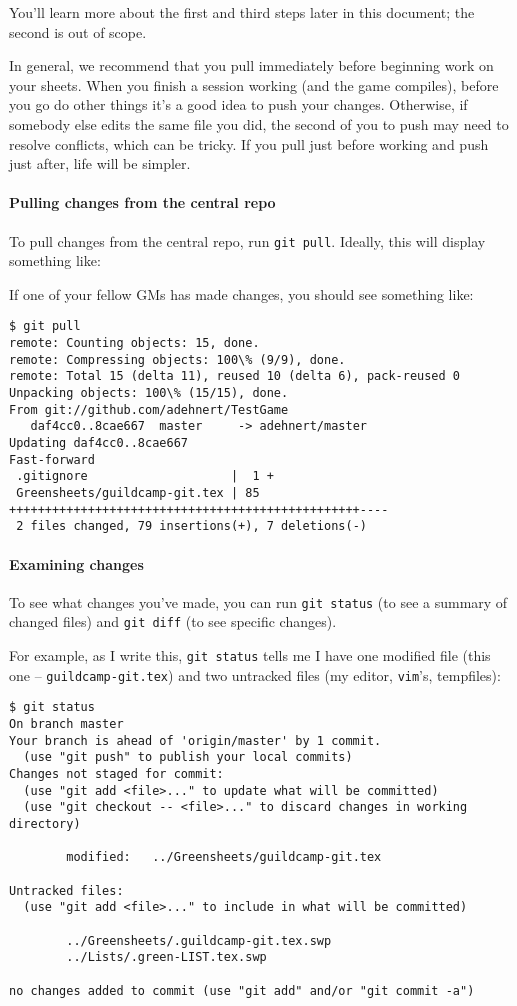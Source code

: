 \documentclass[green]{testgame}
\begin{document}
You'll learn more about the first and third steps later in this document; the second is out of scope.

In general, we recommend that you pull immediately before beginning work on your sheets. When you finish a session working (and the game compiles), before you go do other things it's a good idea to push your changes. Otherwise, if somebody else edits the same file you did, the second of you to push may need to resolve conflicts, which can be tricky. If you pull just before working and push just after, life will be simpler.

\paragraph*{Pulling changes from the central repo}

To pull changes from the central repo, run \texttt{git pull}. Ideally, this will display something like:\\

If one of your fellow GMs has made changes, you should see something like:
\begin{verbatim}
$ git pull
remote: Counting objects: 15, done.
remote: Compressing objects: 100\% (9/9), done.
remote: Total 15 (delta 11), reused 10 (delta 6), pack-reused 0
Unpacking objects: 100\% (15/15), done.
From git://github.com/adehnert/TestGame
   daf4cc0..8cae667  master     -> adehnert/master
Updating daf4cc0..8cae667
Fast-forward
 .gitignore                    |  1 +
 Greensheets/guildcamp-git.tex | 85 +++++++++++++++++++++++++++++++++++++++++++++++++----
 2 files changed, 79 insertions(+), 7 deletions(-)
\end{verbatim}

\paragraph*{Examining changes}

To see what changes you've made, you can run \texttt{git status} (to see a summary of changed files) and \texttt{git diff} (to see specific changes).

For example, as I write this, \texttt{git status} tells me I have one modified file (this one -- \texttt{guildcamp-git.tex}) and two untracked files (my editor, \texttt{vim}'s, tempfiles):
\begin{verbatim}
$ git status
On branch master
Your branch is ahead of 'origin/master' by 1 commit.
  (use "git push" to publish your local commits)
Changes not staged for commit:
  (use "git add <file>..." to update what will be committed)
  (use "git checkout -- <file>..." to discard changes in working directory)

        modified:   ../Greensheets/guildcamp-git.tex

Untracked files:
  (use "git add <file>..." to include in what will be committed)

        ../Greensheets/.guildcamp-git.tex.swp
        ../Lists/.green-LIST.tex.swp

no changes added to commit (use "git add" and/or "git commit -a")
\end{verbatim}
\end{document}
